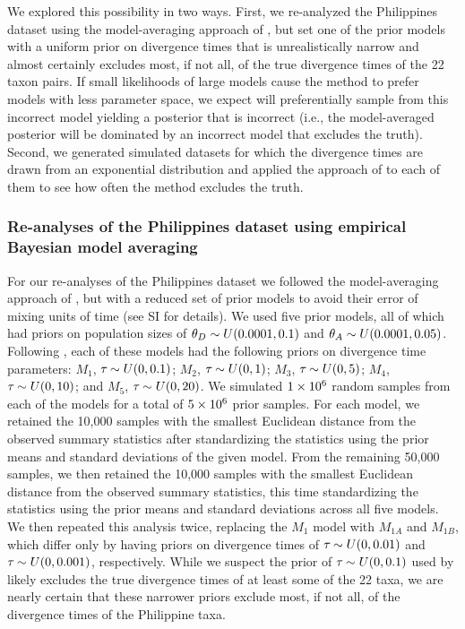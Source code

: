 We explored this possibility in two ways.
First, we re-analyzed the Philippines dataset using the model-averaging
approach of \citet{Hickerson2013}, but set one of the prior models with a
uniform prior on divergence times that is unrealistically narrow and almost
certainly excludes most, if not all, of the true divergence times of the 22
taxon pairs.
If small likelihoods of large models cause the method to prefer models with
less parameter space, we expect \msb will preferentially sample from this
incorrect model yielding a posterior that is incorrect (i.e., the
model-averaged posterior will be dominated by an incorrect model that excludes
the truth).
Second, we generated simulated datasets for which the divergence times are
drawn from an exponential distribution and applied the approach of
\citet{Hickerson2013} to each of them to see how often the method excludes the
truth.

\subsubsection{Re-analyses of the Philippines dataset using empirical Bayesian
model averaging}

For our re-analyses of the Philippines dataset we followed the model-averaging
approach of \citet{Hickerson2013}, but with a reduced set of prior models to
avoid their error of mixing units of time (see SI for details).
We used five prior models, all of which had priors on population sizes of
$\meanDescendantTheta{} \sim U(0.0001, 0.1)$ and $\ancestralTheta{} \sim
U(0.0001, 0.05)$.
Following \citet{Hickerson2013}, each of these models had the following
priors on divergence time parameters:
$M_1$, $\tau_{} \sim U(0, 0.1)$;
$M_2$, $\tau_{} \sim U(0, 1)$;
$M_3$, $\tau_{} \sim U(0, 5)$;
$M_4$, $\tau_{} \sim U(0, 10)$; and
$M_5$, $\tau_{} \sim U(0, 20)$.
We simulated $1\times 10^{6}$ random samples from each of the models for a total of
$5\times 10^{6}$ prior samples.
For each model, we retained the 10,000 samples with the smallest Euclidean
distance from the observed summary statistics after standardizing the
statistics using the prior means and standard deviations of the given model.
From the remaining 50,000 samples, we then retained the 10,000 samples with the
smallest Euclidean distance from the observed summary statistics, this time
standardizing the statistics using the prior means and standard deviations
across all five models.
We then repeated this analysis twice, replacing the $M_1$ model with
$M_{1A}$ and $M_{1B}$, which differ only by having priors on divergence
times of $\tau_{} \sim U(0, 0.01)$ and $\tau_{} \sim U(0, 0.001)$,
respectively.
While we suspect the prior of $\tau_{} \sim U(0, 0.1)$ used by
\citet{Hickerson2013} likely excludes the true divergence times of at least
some of the 22 taxa, we are nearly certain that these narrower priors exclude
most, if not all, of the divergence times of the Philippine taxa.

